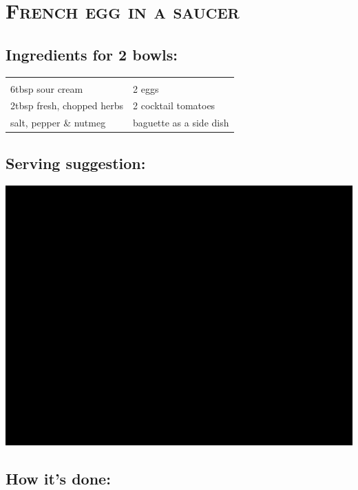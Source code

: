 \section{\textsc{French egg in a saucer}}

\subsection*{Ingredients for 2 bowls:}

\begin{tabular}{p{7.5cm} p{7.5cm}}
	& \\
	6tbsp sour cream & 2 eggs \\
	2tbsp fresh, chopped herbs  & 2 cocktail tomatoes \\
  salt, pepper \& nutmeg & baguette as a side dish
\end{tabular}

\subsection*{Serving suggestion:}

\includegraphics[width=\textwidth]{img/ph.jpg} \cite{eiimnaepfchen}

\subsection*{How it's done:}

